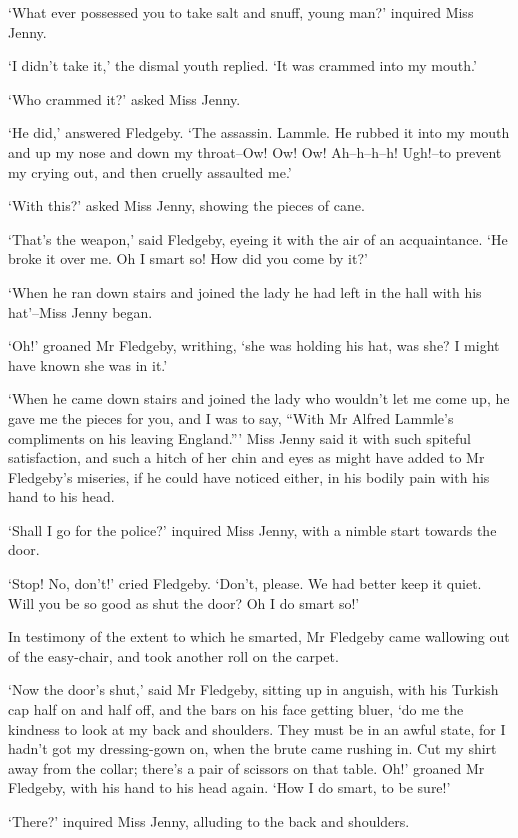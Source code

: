 ‘What ever possessed you to take salt and snuff, young man?’ inquired
Miss Jenny.

‘I didn’t take it,’ the dismal youth replied. ‘It was crammed into my
mouth.’

‘Who crammed it?’ asked Miss Jenny.

‘He did,’ answered Fledgeby. ‘The assassin. Lammle. He rubbed it into
my mouth and up my nose and down my throat--Ow! Ow! Ow! Ah--h--h--h!
Ugh!--to prevent my crying out, and then cruelly assaulted me.’

‘With this?’ asked Miss Jenny, showing the pieces of cane.

‘That’s the weapon,’ said Fledgeby, eyeing it with the air of an
acquaintance. ‘He broke it over me. Oh I smart so! How did you come by
it?’

‘When he ran down stairs and joined the lady he had left in the hall
with his hat’--Miss Jenny began.

‘Oh!’ groaned Mr Fledgeby, writhing, ‘she was holding his hat, was she?
I might have known she was in it.’

‘When he came down stairs and joined the lady who wouldn’t let me come
up, he gave me the pieces for you, and I was to say, “With Mr Alfred
Lammle’s compliments on his leaving England.”’ Miss Jenny said it with
such spiteful satisfaction, and such a hitch of her chin and eyes as
might have added to Mr Fledgeby’s miseries, if he could have noticed
either, in his bodily pain with his hand to his head.

‘Shall I go for the police?’ inquired Miss Jenny, with a nimble start
towards the door.

‘Stop! No, don’t!’ cried Fledgeby. ‘Don’t, please. We had better keep it
quiet. Will you be so good as shut the door? Oh I do smart so!’

In testimony of the extent to which he smarted, Mr Fledgeby came
wallowing out of the easy-chair, and took another roll on the carpet.

‘Now the door’s shut,’ said Mr Fledgeby, sitting up in anguish, with
his Turkish cap half on and half off, and the bars on his face getting
bluer, ‘do me the kindness to look at my back and shoulders. They must
be in an awful state, for I hadn’t got my dressing-gown on, when the
brute came rushing in. Cut my shirt away from the collar; there’s a pair
of scissors on that table. Oh!’ groaned Mr Fledgeby, with his hand to
his head again. ‘How I do smart, to be sure!’

‘There?’ inquired Miss Jenny, alluding to the back and shoulders.

